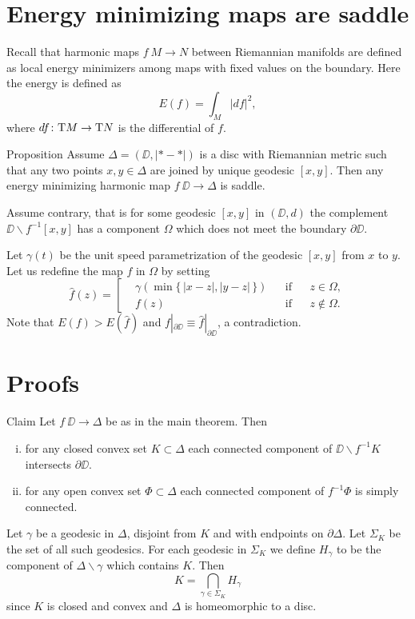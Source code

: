 \documentclass{article}
\begin{document}
\section{Energy minimizing maps are saddle}

Recall that harmonic maps $f\:M\to N$ between Riemannian manifolds are defined as local energy minimizers 
among maps with fixed values on the boundary.
Here the energy is defined as 
\[E(f)=\int_M|df|^2,\]
where $df\colon\mathrm{T} M\to \mathrm{T} N$ is the differential of $f$.

\begin{thm}{Proposition} 
Assume $\Delta=(\DD,|{*}-{*}|)$ is a disc with Riemannian metric such that any two points $x,y\in\Delta$ are joined by unique geodesic $[x,y]$.
Then any energy minimizing harmonic map $f\:\DD\to\Delta$ is saddle.
\end{thm}

Assume contrary, that is for some geodesic $[x,y]$ in $(\DD,d)$ the complement $\DD\backslash f^{-1}[x,y]$ has a component 
$\Omega$ which does not meet the boundary $\partial\DD$.

Let $\gamma(t)$ be the unit speed parametrization of the geodesic $[x,y]$ from $x$ to $y$.
Let us redefine the map $f$ in $\Omega$ by setting 
\[\hat f(z)=
\left[
\begin{aligned}
&\gamma(\min\{\,|x-z|,|y-z|\,\})&&\text{if}&& z\in\Omega,
\\
&f(z)&&\text{if}&& z\notin\Omega.
\end{aligned}
\right.\]
Note that $E(f)>E(\hat f)$ and $f|_{\partial \DD}\equiv \hat f|_{\partial \DD}$, a contradiction.
\qeds


\section{Proofs}

\begin{thm}{Claim}\label{claim}
Let $f\:\DD\to \Delta$ be as in the main theorem.
Then 
\begin{enumerate}[(i)]
\item for any closed convex set $K\subset\Delta$ each connected component of $\DD\backslash f^{-1}K$ intersects $\partial\DD$.
\item for any open convex set $\Phi\subset\Delta$ each connected component of $f^{-1}\Phi$ is simply connected.
\end{enumerate}
\end{thm}

Let $\gamma$ be a geodesic in $\Delta$, disjoint from $K$ and with endpoints on $\partial\Delta$.
Let $\Sigma_K$ be the set of all such geodesics.
 For each geodesic in $\Sigma_K$ we define
$H_\gamma$ to be the component of $\Delta\backslash\gamma$ which contains $K$. Then
\[K=\bigcap_{\gamma\in\Sigma_K} H_\gamma\]
since $K$ is closed and convex and $\Delta$ is homeomorphic to a disc.
\end{document}
